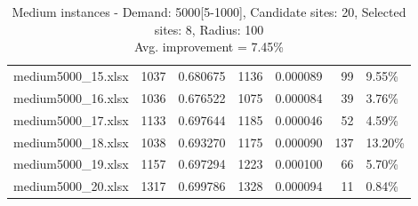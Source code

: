 \documentclass[11pt, a4paper]{article}
\begin{document}
\begin{table}[h!]
\begin{adjustbox}{max width=\textwidth}
\begin{tabular}{lrrrrrl}
		 medium5000\_15.xlsx &   1037 &           0.680675 &    1136 &           0.000089 &            99 &        9.55\% \\
		 medium5000\_16.xlsx &   1036 &           0.676522 &    1075 &           0.000084 &            39 &        3.76\% \\
		 medium5000\_17.xlsx &   1133 &           0.697644 &    1185 &           0.000046 &            52 &        4.59\% \\
		 medium5000\_18.xlsx &   1038 &           0.693270 &    1175 &           0.000090 &           137 &       13.20\% \\
		 medium5000\_19.xlsx &   1157 &           0.697294 &    1223 &           0.000100 &            66 &        5.70\% \\
		 medium5000\_20.xlsx &   1317 &           0.699786 &    1328 &           0.000094 &            11 &        0.84\% \\
		\bottomrule
		\end{tabular}
\end{adjustbox}
\caption{Medium instances - Demand: 5000[5-1000], Candidate sites: 20, Selected sites: 8, Radius: 100\\ \centering Avg. improvement = 7.45\%}
\label{tab:medium_instances}
\end{table}
\end{document}
